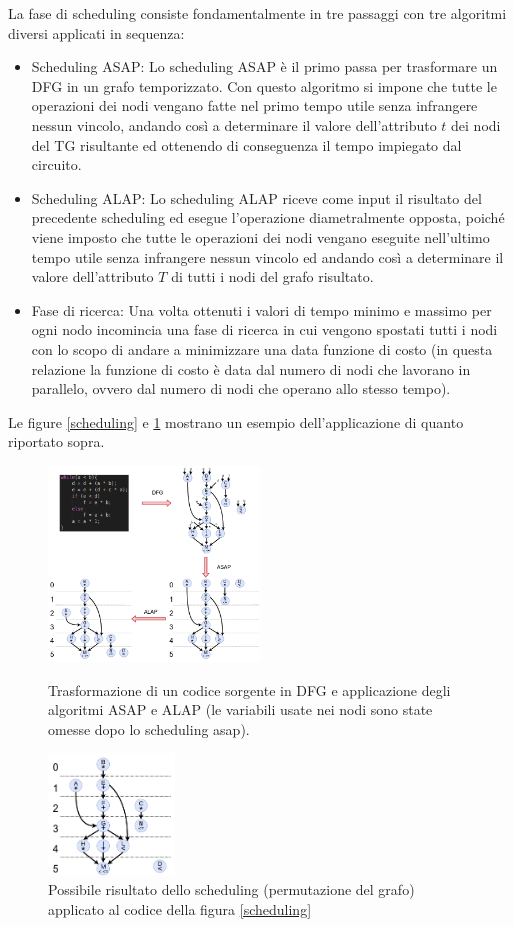 \documentclass[]{IEEEtran}
\begin{document}
La fase di scheduling consiste fondamentalmente in tre passaggi con tre algoritmi diversi applicati in sequenza:
\begin{itemize}
	\item  Scheduling ASAP: Lo scheduling ASAP è il primo passa per trasformare un DFG in un grafo temporizzato. Con questo algoritmo si impone che tutte le operazioni dei nodi vengano fatte nel primo tempo utile senza infrangere nessun vincolo, andando così a determinare il valore dell'attributo $t$ dei nodi del TG risultante ed ottenendo di conseguenza il tempo impiegato dal circuito.
	\item Scheduling ALAP: Lo scheduling ALAP riceve come input il risultato del precedente scheduling ed esegue l'operazione diametralmente opposta, poiché viene imposto che tutte le operazioni dei nodi vengano eseguite nell'ultimo tempo utile senza infrangere nessun vincolo ed andando così a determinare il valore dell'attributo $T$ di tutti i nodi del grafo risultato.
	\item Fase di ricerca: Una volta ottenuti i valori di tempo minimo e massimo per ogni nodo incomincia una fase di ricerca in cui vengono spostati tutti i nodi con lo scopo di andare a minimizzare una data funzione di costo (in questa relazione la funzione di costo è data dal numero di nodi che lavorano in parallelo, ovvero dal numero di nodi che operano allo stesso tempo).
\end{itemize}
Le figure \ref{scheduling} e \ref{scheduling2} mostrano un esempio dell'applicazione di quanto riportato sopra.
\begin{figure}[htp]
	\includegraphics[width=0.5\textwidth]{images/schedule.png}
	\caption{Trasformazione di un codice sorgente in DFG e applicazione degli algoritmi ASAP e ALAP (le variabili usate nei nodi sono state omesse dopo lo scheduling asap).}
	\label{scheduling}
	\includegraphics[width=0.3\textwidth]{images/scheduling2.png}
	\caption{Possibile risultato  dello scheduling (permutazione del grafo) applicato al codice della figura \ref{scheduling}}
	\label{scheduling2}
\end{figure}
\end{document}
